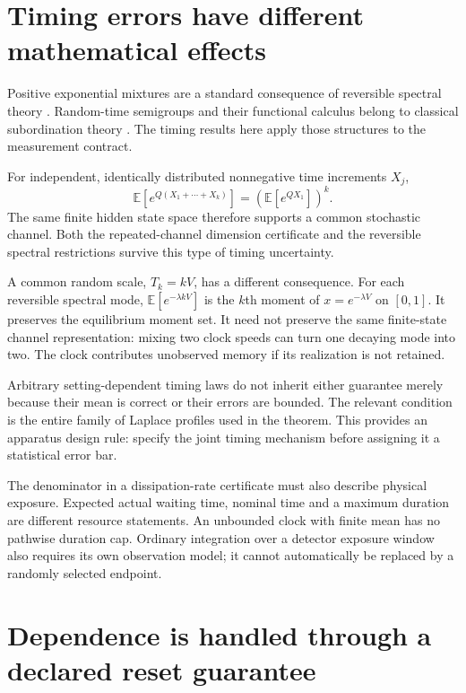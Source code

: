 \section{Timing errors have different mathematical effects}

Positive exponential mixtures are a standard consequence of reversible
spectral theory \cite{vlAldousFill2002}. Random-time semigroups and their
functional calculus belong to classical subordination theory
\cite{vlSchilling2012}. The timing results here apply those structures to the
measurement contract.

For independent, identically distributed nonnegative time increments $X_j$,
\[
 \mathbb E\!\left[e^{Q(X_1+\cdots+X_k)}\right]
 =\left(\mathbb E[e^{QX_1}]\right)^k.
\]
The same finite hidden state space therefore supports a common stochastic
channel. Both the repeated-channel dimension certificate and the reversible
spectral restrictions survive this type of timing uncertainty.

A common random scale, $T_k=kV$, has a different consequence. For each
reversible spectral mode, $\mathbb E[e^{-\lambda kV}]$ is the $k$th moment of
$x=e^{-\lambda V}$ on $[0,1]$. It preserves the equilibrium moment set. It need
not preserve the same finite-state channel representation: mixing two clock
speeds can turn one decaying mode into two. The clock contributes unobserved
memory if its realization is not retained.

Arbitrary setting-dependent timing laws do not inherit either guarantee
merely because their mean is correct or their errors are bounded. The relevant
condition is the entire family of Laplace profiles used in the theorem. This
provides an apparatus design rule: specify the joint timing mechanism before
assigning it a statistical error bar.

The denominator in a dissipation-rate certificate must also describe physical
exposure. Expected actual waiting time, nominal time and a maximum duration
are different resource statements. An unbounded clock with finite mean has no
pathwise duration cap. Ordinary integration over a detector exposure window
also requires its own observation model; it cannot automatically be replaced
by a randomly selected endpoint.

\section{Dependence is handled through a declared reset guarantee}

